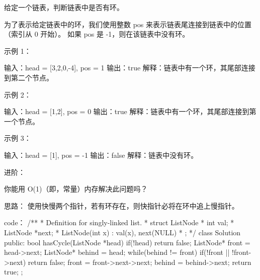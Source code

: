 给定一个链表，判断链表中是否有环。

为了表示给定链表中的环，我们使用整数 pos 来表示链表尾连接到链表中的位置（索引从 0 开始）。 如果 pos 是 -1，则在该链表中没有环。

 

示例 1：

输入：head = [3,2,0,-4], pos = 1
输出：true
解释：链表中有一个环，其尾部连接到第二个节点。

示例 2：

输入：head = [1,2], pos = 0
输出：true
解释：链表中有一个环，其尾部连接到第一个节点。

示例 3：

输入：head = [1], pos = -1
输出：false
解释：链表中没有环。

 

进阶：

你能用 O(1)（即，常量）内存解决此问题吗？






























思路：
使用快慢两个指针，若有环存在，则快指针必将在环中追上慢指针。




























code：
/**
 * Definition for singly-linked list.
 * struct ListNode {
 *     int val;
 *     ListNode *next;
 *     ListNode(int x) : val(x), next(NULL) {}
 * };
 */
class Solution {
public:
    bool hasCycle(ListNode *head) {
        if(!head) return false;
        ListNode* front = head->next;
        ListNode* behind = head;
        while(behind != front)
        {
            if(!front || !front->next) return false;
            front = front->next->next;
            behind = behind->next;
        }
        return true;
    }
};